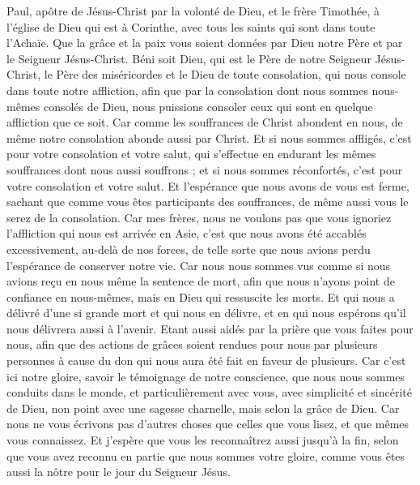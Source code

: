\begin{multicols}{2}
\VerseOne{}Paul, apôtre de Jésus-Christ par la volonté de Dieu, et le frère Timothée, à l'église de Dieu qui est à Corinthe, avec tous les saints qui sont dans toute l'Achaïe.
Que la grâce et la paix vous soient données par Dieu notre Père et par le Seigneur Jésus-Christ.
Béni soit Dieu, qui est le Père de notre Seigneur Jésus-Christ, le Père des miséricordes et le Dieu de toute consolation,
qui nous console dans toute notre affliction, afin que par la consolation dont nous sommes nous-mêmes 
consolés de Dieu, nous puissions consoler ceux qui sont en quelque affliction que ce soit.
Car comme les souffrances de Christ abondent en nous, de même notre consolation abonde aussi par Christ.
Et si nous sommes affligés, c’est pour votre consolation et votre salut, qui s’effectue en endurant les mêmes souffrances dont nous aussi souffrons ; et si nous sommes réconfortés, c’est pour votre consolation et votre salut.
Et l'espérance que nous avons de vous est ferme, sachant que comme vous êtes participants des souffrances, de même aussi vous le serez de la consolation.
Car mes frères, nous ne voulons pas que vous ignoriez l’affliction qui nous est arrivée en Asie, c'est que nous avons été accablés excessivement, au-delà de nos forces, de telle sorte que nous avions perdu l'espérance de conserver notre vie.
Car nous nous sommes vus comme si nous avions reçu en nous même la sentence de mort, afin que nous n'ayons point de confiance en nous-mêmes, mais en Dieu qui ressuscite les morts.
Et qui nous a délivré d'une si grande mort et qui nous en délivre, et en qui nous espérons qu'il nous délivrera aussi à l'avenir.
Etant aussi aidés par la prière que vous faites pour nous, afin que des actions de grâces soient rendues pour nous par plusieurs personnes à cause du don qui nous aura été fait en faveur de plusieurs.
Car c'est ici notre gloire, savoir le témoignage de notre conscience, que nous nous sommes conduits dans le monde, et particulièrement avec vous, avec simplicité et sincérité de Dieu, non point avec une sagesse charnelle, mais selon la grâce de Dieu.
Car nous ne vous écrivons pas d'autres choses que celles que vous lisez, et que mêmes vous connaissez. Et j'espère que vous les reconnaîtrez aussi jusqu'à la fin,
selon que vous avez reconnu en partie que nous sommes votre gloire, comme vous êtes aussi la nôtre pour le jour du Seigneur Jésus.

\end{multicols}
